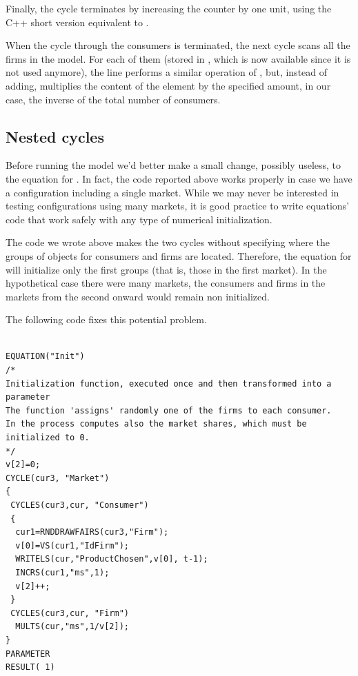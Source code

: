 \documentclass [11pt,a4paper] {book}
\begin{document}
Finally, the cycle terminates by increasing the counter  by one unit, using the C++ short version equivalent to .

When the cycle through the consumers is terminated, the next cycle scans all the firms in the model. For each of them (stored in , which is now available since it is not used anymore), the line  performs a similar operation of , but, instead of adding, multiplies the content of the element by the specified amount, in our case, the inverse of the total number of consumers.

\subsection{Nested cycles}

Before running the model we'd better make a small change, possibly useless, to the equation for . In fact, the code reported above works properly in case we have a configuration including a single market. While we may never be interested in testing configurations using many markets, it is good practice to write equations' code that work safely with any type of numerical initialization.

The code we wrote above makes the two cycles without specifying where the groups of objects for consumers and firms are located. Therefore, the equation for  will initialize only the first groups (that is, those in the first market). In the hypothetical case there were many markets, the consumers and firms in the markets from the second onward would remain non initialized.

The following code fixes this potential problem.


\begin{minipage}[h]{10cm}
\small
\begin{verbatim}

EQUATION("Init")
/*
Initialization function, executed once and then transformed into a parameter
The function 'assigns' randomly one of the firms to each consumer.
In the process computes also the market shares, which must be initialized to 0.
*/
v[2]=0;
CYCLE(cur3, "Market")
{
 CYCLES(cur3,cur, "Consumer")
 {
  cur1=RNDDRAWFAIRS(cur3,"Firm");
  v[0]=VS(cur1,"IdFirm");
  WRITELS(cur,"ProductChosen",v[0], t-1);
  INCRS(cur1,"ms",1);
  v[2]++;
 }
 CYCLES(cur3,cur, "Firm")
  MULTS(cur,"ms",1/v[2]);
}  
PARAMETER
RESULT( 1)

\end{verbatim}
\normalsize
\end{minipage}
\end{document}
